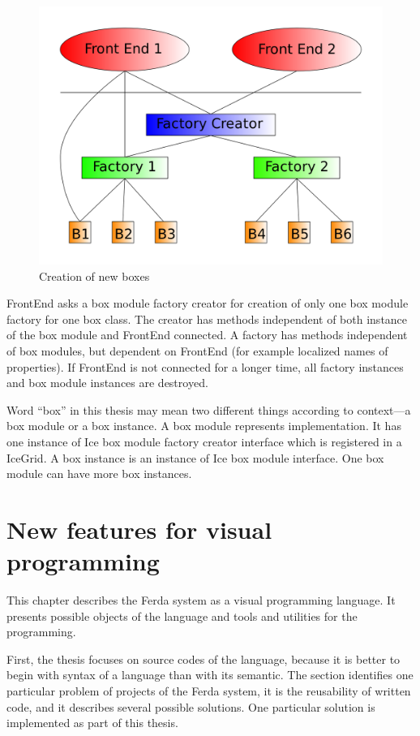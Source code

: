 \documentclass[a4paper,12pt]{book}
\begin{document}
\begin{figure}
	\noindent\includegraphics[width=1\textwidth]{creatorFactory}
	\caption{Creation of new boxes}
	\label{fig:creatorFactory}
\end{figure}

FrontEnd asks a box module factory creator for creation of only one box module factory for one box class. The creator has methods independent of both instance of the box module and FrontEnd connected. A factory has methods independent of box modules, but dependent on FrontEnd (for example localized names of properties). If FrontEnd is not connected for a longer time, all factory instances and box module instances are destroyed.

Word ``box'' in this thesis may mean two different things according to context---a box module or a box instance. A box module represents implementation. It has one instance of Ice box module factory creator interface which is registered in a IceGrid. A box instance is an instance of Ice box module interface. One box module can have more box instances.

\chapter{New features for visual programming}
This chapter describes the Ferda system as a visual programming language. It presents possible objects of the language and tools and utilities for the programming.

First, the thesis focuses on source codes of the language, because it is better to begin with syntax of a language than with its semantic. The section identifies one particular problem of projects of the Ferda system, it is the reusability of written code, and it describes several possible solutions. One particular solution is implemented as part of this thesis.
\end{document}
